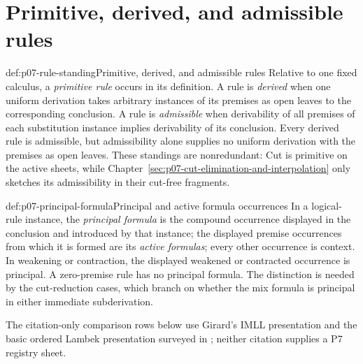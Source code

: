 \section{Primitive, derived, and admissible rules}

\begin{hbdefinition}{def:p07-rule-standing}{Primitive, derived, and admissible rules}
Relative to one fixed calculus, a \emph{primitive rule} occurs in its
definition.  A rule is \emph{derived} when one uniform derivation takes
arbitrary instances of its premises as open leaves to the corresponding
conclusion.  A rule is \emph{admissible} when derivability of all premises of
each substitution instance implies derivability of its conclusion.  Every
derived rule is admissible, but admissibility alone supplies no uniform
derivation with the premises as open leaves.  These standings are
nonredundant: Cut is primitive on the active sheets, while
Chapter~\ref{sec:p07-cut-elimination-and-interpolation} only sketches its
admissibility in their cut-free fragments.
\end{hbdefinition}

\begin{hbdefinition}{def:p07-principal-formula}{Principal and active formula occurrences}
In a logical-rule instance, the \emph{principal formula} is the compound
occurrence displayed in the conclusion and introduced by that instance; the
displayed premise occurrences from which it is formed are its
\emph{active formulas}; every other occurrence is context.  In weakening or
contraction, the displayed weakened or contracted occurrence is principal.
A zero-premise rule has no principal formula.  The distinction is needed by
the cut-reduction cases, which branch on whether the mix formula is principal
in either immediate subderivation.
\end{hbdefinition}

The citation-only comparison rows below use Girard's IMLL presentation
\cite{Girard1987} and the basic ordered Lambek presentation surveyed in
\cite{GalatosJipsenKowalskiOno2007}; neither citation supplies a P7 registry
sheet.

